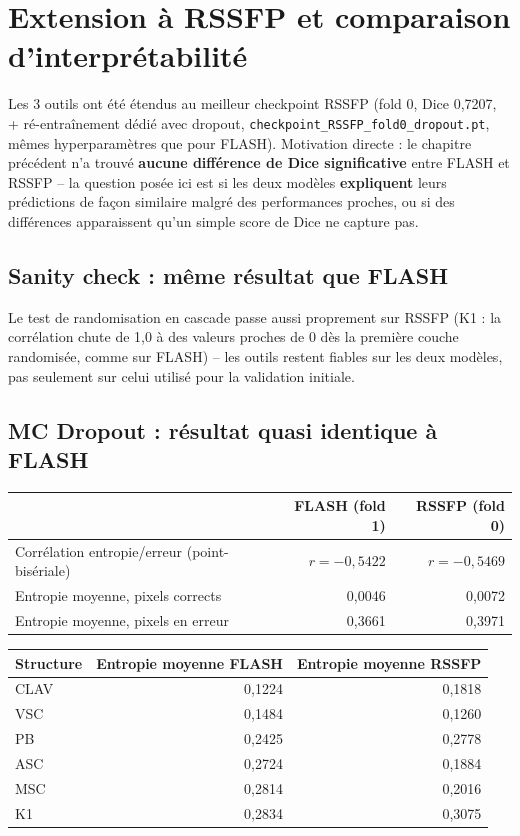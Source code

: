 \documentclass[11pt,a4paper]{report}
\begin{document}
\section{Extension à RSSFP et comparaison d'interprétabilité}

Les 3 outils ont été étendus au meilleur checkpoint RSSFP (fold 0, Dice 0,7207,
+ ré-entraînement dédié avec dropout, \texttt{checkpoint\_RSSFP\_fold0\_dropout.pt},
mêmes hyperparamètres que pour FLASH). Motivation directe : le chapitre précédent
n'a trouvé \textbf{aucune différence de Dice significative} entre FLASH et RSSFP --
la question posée ici est si les deux modèles \textbf{expliquent} leurs prédictions
de façon similaire malgré des performances proches, ou si des différences
apparaissent qu'un simple score de Dice ne capture pas.

\subsection{Sanity check : même résultat que FLASH}

Le test de randomisation en cascade passe aussi proprement sur RSSFP (K1 : la
corrélation chute de 1,0 à des valeurs proches de 0 dès la première couche
randomisée, comme sur FLASH) -- les outils restent fiables sur les deux modèles,
pas seulement sur celui utilisé pour la validation initiale.

\subsection{MC Dropout : résultat quasi identique à FLASH}

\begin{center}
\begin{tabular}{lrr}
\toprule
& FLASH (fold 1) & RSSFP (fold 0) \\
\midrule
Corrélation entropie/erreur (point-bisériale) & $r=-0{,}5422$ & $r=-0{,}5469$ \\
Entropie moyenne, pixels corrects & 0,0046 & 0,0072 \\
Entropie moyenne, pixels en erreur & 0,3661 & 0,3971 \\
\bottomrule
\end{tabular}
\end{center}

\begin{center}
\begin{tabular}{lrr}
\toprule
Structure & Entropie moyenne FLASH & Entropie moyenne RSSFP \\
\midrule
CLAV & 0,1224 & 0,1818 \\
VSC  & 0,1484 & 0,1260 \\
PB   & 0,2425 & 0,2778 \\
ASC  & 0,2724 & 0,1884 \\
MSC  & 0,2814 & 0,2016 \\
K1   & 0,2834 & 0,3075 \\
\bottomrule
\end{tabular}
\end{center}
\end{document}
